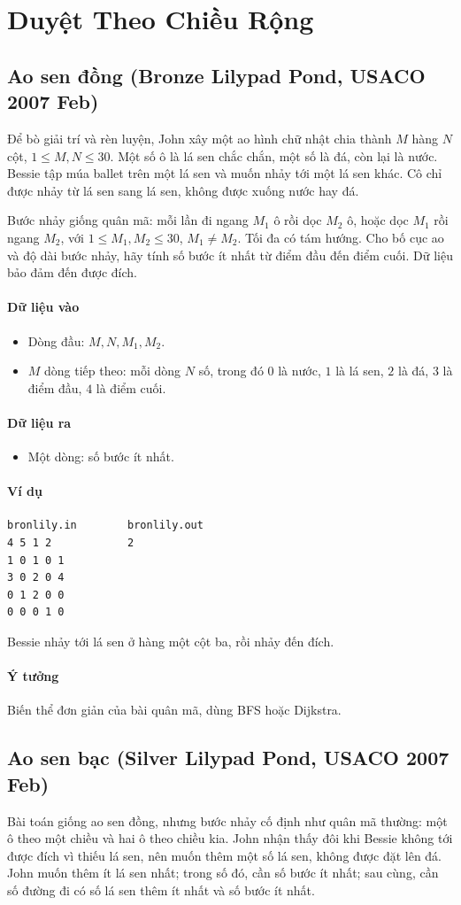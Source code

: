 \documentclass[11pt]{article}
\newcommand{\problem}[1]{\subsection{#1}}
\newcommand{\iosec}[1]{\paragraph{#1}}
\begin{document}
\section{Duyệt Theo Chiều Rộng}

\problem{Ao sen đồng (Bronze Lilypad Pond, USACO 2007 Feb)}

Để bò giải trí và rèn luyện, John xây một ao hình chữ nhật chia thành \(M\) hàng \(N\) cột, \(1 \le M,N \le 30\). Một số ô là lá sen chắc chắn, một số là đá, còn lại là nước. Bessie tập múa ballet trên một lá sen và muốn nhảy tới một lá sen khác. Cô chỉ được nhảy từ lá sen sang lá sen, không được xuống nước hay đá.

Bước nhảy giống quân mã: mỗi lần đi ngang \(M_1\) ô rồi dọc \(M_2\) ô, hoặc dọc \(M_1\) rồi ngang \(M_2\), với \(1 \le M_1,M_2 \le 30\), \(M_1\ne M_2\). Tối đa có tám hướng. Cho bố cục ao và độ dài bước nhảy, hãy tính số bước ít nhất từ điểm đầu đến điểm cuối. Dữ liệu bảo đảm đến được đích.

\iosec{Dữ liệu vào}
\begin{itemize}
  \item Dòng đầu: \(M,N,M_1,M_2\).
  \item \(M\) dòng tiếp theo: mỗi dòng \(N\) số, trong đó \(0\) là nước, \(1\) là lá sen, \(2\) là đá, \(3\) là điểm đầu, \(4\) là điểm cuối.
\end{itemize}

\iosec{Dữ liệu ra}
\begin{itemize}
  \item Một dòng: số bước ít nhất.
\end{itemize}

\iosec{Ví dụ}
\begin{verbatim}
bronlily.in        bronlily.out
4 5 1 2            2
1 0 1 0 1
3 0 2 0 4
0 1 2 0 0
0 0 0 1 0
\end{verbatim}

Bessie nhảy tới lá sen ở hàng một cột ba, rồi nhảy đến đích.

\iosec{Ý tưởng}
Biến thể đơn giản của bài quân mã, dùng BFS hoặc Dijkstra.

\problem{Ao sen bạc (Silver Lilypad Pond, USACO 2007 Feb)}

Bài toán giống ao sen đồng, nhưng bước nhảy cố định như quân mã thường: một ô theo một chiều và hai ô theo chiều kia. John nhận thấy đôi khi Bessie không tới được đích vì thiếu lá sen, nên muốn thêm một số lá sen, không được đặt lên đá. John muốn thêm ít lá sen nhất; trong số đó, cần số bước ít nhất; sau cùng, cần số đường đi có số lá sen thêm ít nhất và số bước ít nhất.
\end{document}

